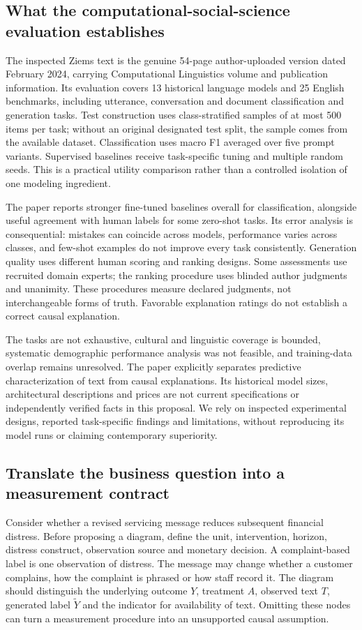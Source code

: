 \subsection{What the computational-social-science evaluation establishes}
The inspected Ziems text is the genuine 54-page author-uploaded version dated February 2024, carrying Computational Linguistics volume and publication information. Its evaluation covers 13 historical language models and 25 English benchmarks, including utterance, conversation and document classification and generation tasks. Test construction uses class-stratified samples of at most 500 items per task; without an original designated test split, the sample comes from the available dataset. Classification uses macro F1 averaged over five prompt variants. Supervised baselines receive task-specific tuning and multiple random seeds. This is a practical utility comparison rather than a controlled isolation of one modeling ingredient.~\citep{exec24_css_original}

The paper reports stronger fine-tuned baselines overall for classification, alongside useful agreement with human labels for some zero-shot tasks. Its error analysis is consequential: mistakes can coincide across models, performance varies across classes, and few-shot examples do not improve every task consistently. Generation quality uses different human scoring and ranking designs. Some assessments use recruited domain experts; the ranking procedure uses blinded author judgments and unanimity. These procedures measure declared judgments, not interchangeable forms of truth. Favorable explanation ratings do not establish a correct causal explanation.~\citep{exec24_css_original}

The tasks are not exhaustive, cultural and linguistic coverage is bounded, systematic demographic performance analysis was not feasible, and training-data overlap remains unresolved. The paper explicitly separates predictive characterization of text from causal explanations. Its historical model sizes, architectural descriptions and prices are not current specifications or independently verified facts in this proposal. We rely on inspected experimental designs, reported task-specific findings and limitations, without reproducing its model runs or claiming contemporary superiority.~\citep{exec24_css_original}

\subsection{Translate the business question into a measurement contract}
Consider whether a revised servicing message reduces subsequent financial distress. Before proposing a diagram, define the unit, intervention, horizon, distress construct, observation source and monetary decision. A complaint-based label is one observation of distress. The message may change whether a customer complains, how the complaint is phrased or how staff record it. The diagram should distinguish the underlying outcome $Y$, treatment $A$, observed text $T$, generated label $\widetilde Y$ and the indicator for availability of text. Omitting these nodes can turn a measurement procedure into an unsupported causal assumption.~\citep{exec24_css_knowledge_reference}

